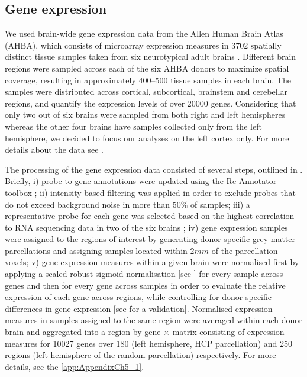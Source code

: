 \subsection{Gene expression}
\label{secGeneExpression}

We used brain-wide gene expression data from the Allen Human Brain Atlas (AHBA), which consists of microarray expression measures in 3702 spatially distinct tissue samples taken from six neurotypical adult brains \citep{Hawrylycz2012}. Different brain regions were sampled across each of the six AHBA donors to maximize spatial coverage, resulting in approximately 400--500 tissue samples in each brain. The samples were distributed across cortical, subcortical, brainstem and cerebellar regions, and quantify the expression levels of over \num{20000} genes. Considering that only two out of six brains were sampled from both right and left hemispheres whereas the other four brains have samples collected only from the left hemisphere, we decided to focus our analyses on the left cortex only. For more details about the data see \citep{Hawrylycz2012}.

The processing of the gene expression data consisted of several steps, outlined in \citep{Arnatkeviciute2019}. Briefly, i) probe-to-gene annotations were updated using the Re-Annotator toolbox \citep{Arloth2015}; ii) intensity based filtering was applied in order to exclude probes that do not exceed background noise in more than $50\%$ of samples; iii) a representative probe for each gene was selected based on the highest correlation to RNA sequencing data in two of the six brains \citep{Miller2014a}; iv) gene expression samples were assigned to the regions-of-interest by generating donor-specific grey matter parcellations and assigning samples located within $2mm$ of the parcellation voxels; v) gene expression measures within a given brain were normalised first by applying a scaled robust sigmoid normalisation [see \citet{Arnatkeviciute2019}] for every sample across genes and then for every gene across samples in order to evaluate the relative expression of each gene across regions, while controlling for donor-specific differences in gene expression [see \citet{Arnatkeviciute2019} for a validation]. Normalised expression measures in samples assigned to the same region were averaged within each donor brain and aggregated into a region by gene $\times$ matrix consisting of expression measures for \num{10027} genes over 180 (left hemisphere, HCP parcellation) and 250 regions (left hemisphere of the random parcellation) respectively. For more details, see the \ref{app:AppendixCh5_1}.


